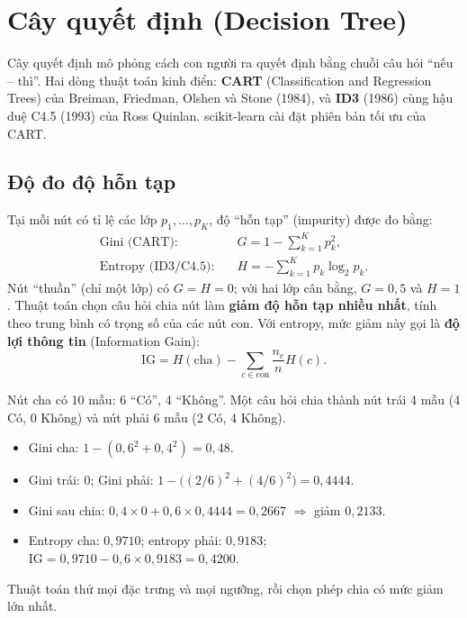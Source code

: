 \section{Cây quyết định (Decision Tree)}

Cây quyết định mô phỏng cách con người ra quyết định bằng chuỗi câu hỏi ``nếu -- thì''. Hai dòng thuật toán kinh điển: \textbf{CART} (Classification and Regression Trees) của Breiman, Friedman, Olshen và Stone (1984), và \textbf{ID3} (1986) cùng hậu duệ C4.5 (1993) của Ross Quinlan. scikit-learn cài đặt phiên bản tối ưu của CART.

\subsection{Độ đo độ hỗn tạp}

Tại mỗi nút có tỉ lệ các lớp $p_1, \dots, p_K$, độ ``hỗn tạp'' (impurity) được đo bằng:
\begin{align}
    \text{Gini (CART)}: \quad & G = 1 - \sum_{k=1}^{K} p_k^2, \\
    \text{Entropy (ID3/C4.5)}: \quad & H = -\sum_{k=1}^{K} p_k \log_2 p_k .
\end{align}
Nút ``thuần'' (chỉ một lớp) có $G = H = 0$; với hai lớp cân bằng, $G = 0{,}5$ và $H = 1$. Thuật toán chọn câu hỏi chia nút làm \textbf{giảm độ hỗn tạp nhiều nhất}, tính theo trung bình có trọng số của các nút con. Với entropy, mức giảm này gọi là \textbf{độ lợi thông tin} (Information Gain):
\begin{equation}
    \mathrm{IG} = H(\text{cha}) - \sum_{c \in \text{con}} \frac{n_c}{n} H(c).
\end{equation}

\begin{example}
Nút cha có 10 mẫu: 6 ``Có'', 4 ``Không''. Một câu hỏi chia thành nút trái 4 mẫu (4 Có, 0 Không) và nút phải 6 mẫu (2 Có, 4 Không).
\begin{itemize}
    \item Gini cha: $1 - (0{,}6^2 + 0{,}4^2) = 0{,}48$.
    \item Gini trái: $0$; Gini phải: $1 - \big((2/6)^2 + (4/6)^2\big) = 0{,}4444$.
    \item Gini sau chia: $0{,}4 \times 0 + 0{,}6 \times 0{,}4444 = 0{,}2667$ $\Rightarrow$ giảm $0{,}2133$.
    \item Entropy cha: $0{,}9710$; entropy phải: $0{,}9183$; $\mathrm{IG} = 0{,}9710 - 0{,}6 \times 0{,}9183 = 0{,}4200$.
\end{itemize}
Thuật toán thử mọi đặc trưng và mọi ngưỡng, rồi chọn phép chia có mức giảm lớn nhất.
\end{example}

